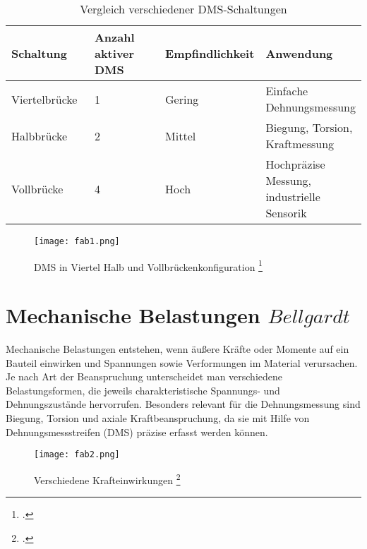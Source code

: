 \bgroup
\def\arraystretch{2}
\begin{table}[h]
\centering
\begin{tabular}{|p{0.25\linewidth}|p{0.25\linewidth}|p{0.25\linewidth}|p{0.25\linewidth}|}
\hline
Schaltung & Anzahl aktiver DMS & Empfindlichkeit & Anwendung \\ \hline
Viertelbrücke & 1 & Gering & Einfache Dehnungsmessung \\ \hline
Halbbrücke & 2 & Mittel & Biegung, Torsion, Kraftmessung \\ \hline
Vollbrücke & 4 & Hoch & Hochpräzise Messung, industrielle Sensorik \\ \hline
\end{tabular}
\caption{Vergleich verschiedener DMS-Schaltungen}
\label{tbl:dms_schaltungen}
\end{table}
\egroup


\begin{figure}[h]
    \begin{center}
        \texttt{[image: fab1.png]}
        \caption[DMS in Viertel\- Halb\- und Vollbr\"uckenkonfiguration (Abbildungsverzeichnis)]{DMS in Viertel\- Halb\- und Vollbr\"uckenkonfiguration
        \footcite{https://learnchannel-tv.com/wp-content/uploads/2020/12/Wheatstone-DMS-Messbrucke-Viertel-Halb-Vollbrucke-1024x423.png}
        }
        \label{fig:fab1}
    \end{center}
\end{figure}






\section{Mechanische Belastungen \(Bellgardt\)}
Mechanische Belastungen entstehen, wenn äußere Kräfte oder Momente auf ein Bauteil einwirken und Spannungen sowie Verformungen im Material verursachen. Je nach Art der Beanspruchung unterscheidet man verschiedene Belastungsformen, die jeweils charakteristische Spannungs- und Dehnungszustände hervorrufen. Besonders relevant für die Dehnungsmessung sind Biegung, Torsion und axiale Kraftbeanspruchung, da sie mit Hilfe von Dehnungsmessstreifen (DMS) präzise erfasst werden können.

\begin{figure}[h]
    \begin{center}
        \texttt{[image: fab2.png]}
        \caption[Verschiedene Krafteinwirkungen (Abbildungsverzeichnis)]{Verschiedene Krafteinwirkungen
        \footcite{https://www.maschinenbau-wissen.de/bilder/skripte/mechanik/belastungsarten-03.PNG}
        }
        \label{fig:fab2}
    \end{center}
\end{figure}
